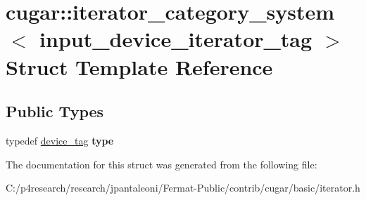 \hypertarget{structcugar_1_1iterator__category__system_3_01input__device__iterator__tag_01_4}{}\section{cugar\+:\+:iterator\+\_\+category\+\_\+system$<$ input\+\_\+device\+\_\+iterator\+\_\+tag $>$ Struct Template Reference}
\label{structcugar_1_1iterator__category__system_3_01input__device__iterator__tag_01_4}
\subsection*{Public Types}
\begin{DoxyCompactItemize}
\item 
\mbox{\label{structcugar_1_1iterator__category__system_3_01input__device__iterator__tag_01_4_a96fe6923e900bfe4cd6df8f6a765b71e}} 
typedef \hyperlink{structcugar_1_1device__tag}{device\+\_\+tag} {\bfseries type}
\end{DoxyCompactItemize}


The documentation for this struct was generated from the following file\+:\begin{DoxyCompactItemize}
\item 
C\+:/p4research/research/jpantaleoni/\+Fermat-\/\+Public/contrib/cugar/basic/iterator.\+h\end{DoxyCompactItemize}
